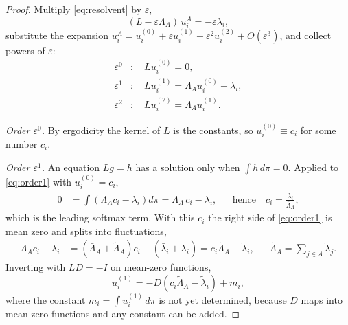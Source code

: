 \documentclass[11pt]{article}
\theoremstyle{remark}
\newcommand{\lbar}{\bar{\lambda}}
\begin{document}
\begin{proof}
Multiply \eqref{eq:resolvent} by $\varepsilon$,
\[
  (L - \varepsilon\Lambda_A)\, u_i^A = -\varepsilon\lambda_i ,
\]
substitute the expansion
$u_i^A = u^{(0)}_i + \varepsilon u^{(1)}_i + \varepsilon^2 u^{(2)}_i +
O(\varepsilon^3)$, and collect powers of $\varepsilon$:
\begin{align}
  \varepsilon^0 &: \quad L u^{(0)}_i = 0, \label{eq:order0}\\
  \varepsilon^1 &: \quad L u^{(1)}_i = \Lambda_A u^{(0)}_i - \lambda_i ,
  \label{eq:order1}\\
  \varepsilon^2 &: \quad L u^{(2)}_i = \Lambda_A u^{(1)}_i .
  \label{eq:order2}
\end{align}

\emph{Order $\varepsilon^0$.} By ergodicity the kernel of $L$ is the
constants, so $u^{(0)}_i \equiv c_i$ for some number $c_i$.

\emph{Order $\varepsilon^1$.} An equation $Lg = h$ has a solution only when
$\int h \, d\pi = 0$. Applied to \eqref{eq:order1} with
$u^{(0)}_i = c_i$,
\begin{align*}
  0 &= \int \left(\Lambda_A c_i - \lambda_i\right) d\pi
     = \bar\Lambda_A\, c_i - \lbar_i ,
  &&\text{hence}\quad c_i = \frac{\lbar_i}{\bar\Lambda_A},
\end{align*}
which is the leading softmax term. With this $c_i$ the right side of
\eqref{eq:order1} is mean zero and splits into fluctuations,
\begin{align*}
  \Lambda_A c_i - \lambda_i
  &= \left(\bar\Lambda_A + \tilde\Lambda_A\right) c_i
     - \left(\lbar_i + \tilde\lambda_i\right)
  = c_i \tilde\Lambda_A - \tilde\lambda_i ,
  &&\tilde\Lambda_A = \textstyle\sum_{j\in A}\tilde\lambda_j .
\end{align*}
Inverting with $LD = -I$ on mean-zero functions,
\[
  u^{(1)}_i = -D\!\left(c_i \tilde\Lambda_A - \tilde\lambda_i\right)
              + m_i ,
\]
where the constant $m_i = \int u^{(1)}_i \, d\pi$ is not yet determined,
because $D$ maps into mean-zero functions and any constant can be added.


\end{proof}
\end{document}

